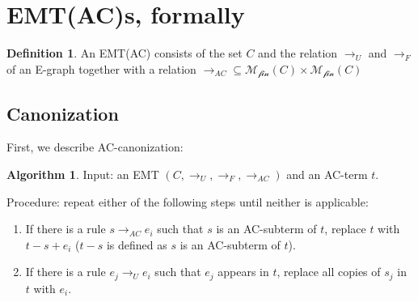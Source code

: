 \documentclass[12pt,a4paper,twoside,openright]{report}
\numberwithin{equation}{chapter}		%
\numberwithin{figure}{chapter}			%
\numberwithin{table}{chapter}			%
\theoremstyle{definition}
\newtheorem*{definition}{Definition}
\newtheorem{algorithm}{Algorithm}
\theoremstyle{plain}
\begin{document}
\section{EMT(AC)s, formally}
\begin{definition}
	An EMT(AC) consists of the set $C$ and the relation $\rightarrow_U$ and $\rightarrow_F$ of an E-graph together with a relation $\rightarrow_{AC} \subseteq \mathcal{M_\textrm{fin}}(C) \times \mathcal{M_\textrm{fin}}(C)$
\end{definition}

\subsection{Canonization}
First, we describe AC-canonization:
\begin{algorithm}
	Input: an EMT $(C, \rightarrow_U, \rightarrow_F, \rightarrow_{AC})$ and an AC-term $t$.
	
	Procedure: repeat either of the following steps until neither is applicable:
		\begin{enumerate}
			\item If there is a rule $s \rightarrow_{AC} e_i$ such that $s$ is an AC-subterm of $t$, replace $t$ with $t - s + e_i$ ($t - s$ is defined as $s$ is an AC-subterm of $t$).
			\item If there is a rule $e_j \rightarrow_U e_i$ such that $e_j$ appears in $t$, replace all copies of $s_j$ in $t$ with $e_i$.
		\end{enumerate}
\end{algorithm}
\end{document}
